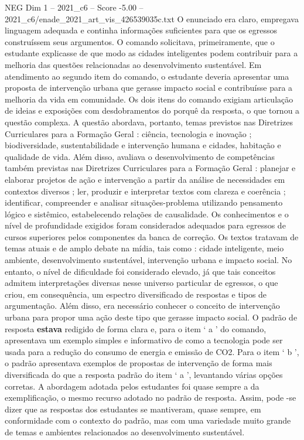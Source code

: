 \begin{textsample}{NEG Dim 1 – 2021\_c6 – Score -5.00 – 2021\_c6/enade\_2021\_art\_vis\_426539035c.txt}
O enunciado era claro, empregava linguagem adequada e continha informações suficientes para que os egressos construíssem seus argumentos.
O comando solicitava, primeiramente, que o estudante explicasse de que modo as cidades inteligentes podem contribuir para a melhoria das questões relacionadas ao desenvolvimento sustentável.
Em atendimento ao segundo item do comando, o estudante deveria apresentar uma proposta de intervenção urbana que gerasse impacto social e contribuísse para a melhoria da vida em comunidade.
Os dois itens do comando exigiam articulação de ideias e exposições com desdobramentos do porquê da resposta, o que tornou a questão complexa.
A questão abordava, portanto, temas previstos nas Diretrizes Curriculares para a Formação Geral : ciência, tecnologia e inovação ; biodiversidade, sustentabilidade e intervenção humana e cidades, habitação e qualidade de vida.
Além disso, avaliava o desenvolvimento de competências também previstas nas Diretrizes Curriculares para a Formação Geral : planejar e elaborar projetos de ação e intervenção a partir da análise de necessidades em contextos diversos ; ler, produzir e interpretar textos com clareza e coerência ; identificar, compreender e analisar situações-problema utilizando pensamento lógico e sistêmico, estabelecendo relações de causalidade.
Os conhecimentos e o nível de profundidade exigidos foram considerados adequados para egressos de cursos superiores pelos componentes da banca de correção.
Os textos tratavam de temas atuais e de amplo debate na mídia, tais como : cidade inteligente, meio ambiente, desenvolvimento sustentável, intervenção urbana e impacto social.
No entanto, o nível de dificuldade foi considerado elevado, já que tais conceitos admitem interpretações diversas nesse universo particular de egressos, o que criou, em consequência, um espectro diversificado de respostas e tipos de argumentação.
Além disso, era necessário conhecer o conceito de intervenção urbana para propor uma ação deste tipo que gerasse impacto social.
O padrão de resposta \textbf{estava} redigido de forma clara e, para o item ‘ a ’ do comando, apresentava um exemplo simples e informativo de como a tecnologia pode ser usada para a redução do consumo de energia e emissão de CO2.
Para o item ‘ b ’, o padrão apresentava exemplos de propostas de intervenção de forma mais diversificada do que a resposta padrão do item ‘ a ’, levantando várias opções corretas.
A abordagem adotada pelos estudantes foi quase sempre a da exemplificação, o mesmo recurso adotado no padrão de resposta.
Assim, pode -se dizer que as respostas dos estudantes se mantiveram, quase sempre, em conformidade com o contexto do padrão, mas com uma variedade muito grande de temas e ambientes relacionados ao desenvolvimento sustentável.

\end{textsample}
